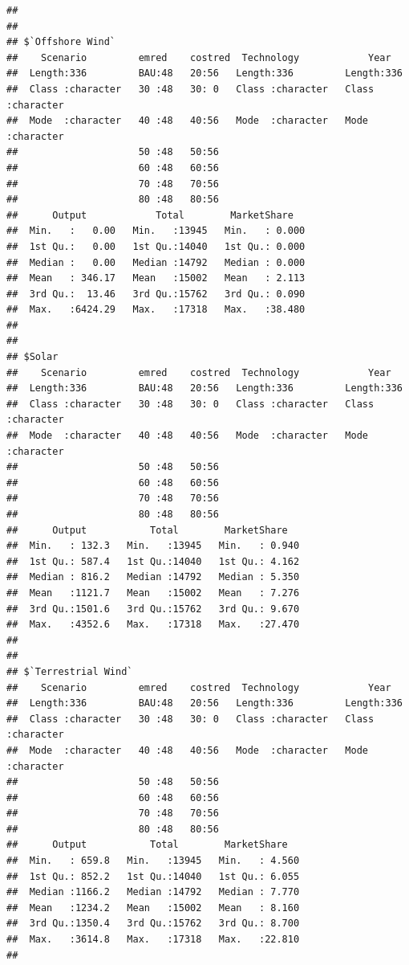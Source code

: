 \documentclass[]{article}
\begin{document}
\begin{verbatim}
##                                                
## 
## $`Offshore Wind`
##    Scenario         emred    costred  Technology            Year          
##  Length:336         BAU:48   20:56   Length:336         Length:336        
##  Class :character   30 :48   30: 0   Class :character   Class :character  
##  Mode  :character   40 :48   40:56   Mode  :character   Mode  :character  
##                     50 :48   50:56                                        
##                     60 :48   60:56                                        
##                     70 :48   70:56                                        
##                     80 :48   80:56                                        
##      Output            Total        MarketShare    
##  Min.   :   0.00   Min.   :13945   Min.   : 0.000  
##  1st Qu.:   0.00   1st Qu.:14040   1st Qu.: 0.000  
##  Median :   0.00   Median :14792   Median : 0.000  
##  Mean   : 346.17   Mean   :15002   Mean   : 2.113  
##  3rd Qu.:  13.46   3rd Qu.:15762   3rd Qu.: 0.090  
##  Max.   :6424.29   Max.   :17318   Max.   :38.480  
##                                                    
## 
## $Solar
##    Scenario         emred    costred  Technology            Year          
##  Length:336         BAU:48   20:56   Length:336         Length:336        
##  Class :character   30 :48   30: 0   Class :character   Class :character  
##  Mode  :character   40 :48   40:56   Mode  :character   Mode  :character  
##                     50 :48   50:56                                        
##                     60 :48   60:56                                        
##                     70 :48   70:56                                        
##                     80 :48   80:56                                        
##      Output           Total        MarketShare    
##  Min.   : 132.3   Min.   :13945   Min.   : 0.940  
##  1st Qu.: 587.4   1st Qu.:14040   1st Qu.: 4.162  
##  Median : 816.2   Median :14792   Median : 5.350  
##  Mean   :1121.7   Mean   :15002   Mean   : 7.276  
##  3rd Qu.:1501.6   3rd Qu.:15762   3rd Qu.: 9.670  
##  Max.   :4352.6   Max.   :17318   Max.   :27.470  
##                                                   
## 
## $`Terrestrial Wind`
##    Scenario         emred    costred  Technology            Year          
##  Length:336         BAU:48   20:56   Length:336         Length:336        
##  Class :character   30 :48   30: 0   Class :character   Class :character  
##  Mode  :character   40 :48   40:56   Mode  :character   Mode  :character  
##                     50 :48   50:56                                        
##                     60 :48   60:56                                        
##                     70 :48   70:56                                        
##                     80 :48   80:56                                        
##      Output           Total        MarketShare    
##  Min.   : 659.8   Min.   :13945   Min.   : 4.560  
##  1st Qu.: 852.2   1st Qu.:14040   1st Qu.: 6.055  
##  Median :1166.2   Median :14792   Median : 7.770  
##  Mean   :1234.2   Mean   :15002   Mean   : 8.160  
##  3rd Qu.:1350.4   3rd Qu.:15762   3rd Qu.: 8.700  
##  Max.   :3614.8   Max.   :17318   Max.   :22.810  
## 
\end{verbatim}
\end{document}
